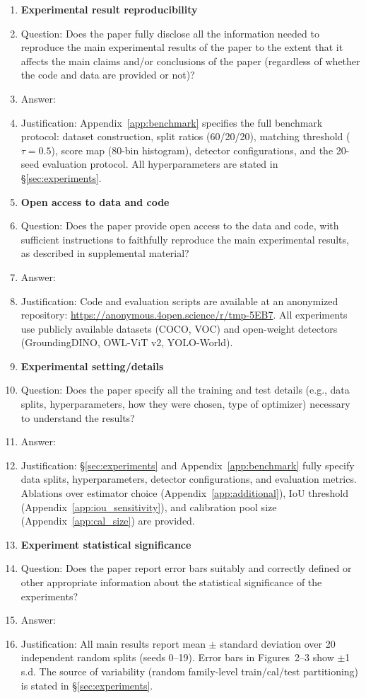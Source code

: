 \begin{enumerate}
    \item {\bf Experimental result reproducibility}
    \item[] Question: Does the paper fully disclose all the information needed to reproduce the main experimental results of the paper to the extent that it affects the main claims and/or conclusions of the paper (regardless of whether the code and data are provided or not)?
    \item[] Answer: \answerYes{}
    \item[] Justification: Appendix~\ref{app:benchmark} specifies the full benchmark protocol: dataset construction, split ratios (60/20/20), matching threshold ($\tau\!=\!0.5$), score map (80-bin histogram), detector configurations, and the 20-seed evaluation protocol. All hyperparameters are stated in \S\ref{sec:experiments}.

\item {\bf Open access to data and code}
    \item[] Question: Does the paper provide open access to the data and code, with sufficient instructions to faithfully reproduce the main experimental results, as described in supplemental material?
    \item[] Answer: \answerYes{}
    \item[] Justification: Code and evaluation scripts are available at an anonymized repository: \url{https://anonymous.4open.science/r/tmp-5EB7}. All experiments use publicly available datasets (COCO, VOC) and open-weight detectors (GroundingDINO, OWL-ViT v2, YOLO-World).

\item {\bf Experimental setting/details}
    \item[] Question: Does the paper specify all the training and test details (e.g., data splits, hyperparameters, how they were chosen, type of optimizer) necessary to understand the results?
    \item[] Answer: \answerYes{}
    \item[] Justification: \S\ref{sec:experiments} and Appendix~\ref{app:benchmark} fully specify data splits, hyperparameters, detector configurations, and evaluation metrics. Ablations over estimator choice (Appendix~\ref{app:additional}), IoU threshold (Appendix~\ref{app:iou_sensitivity}), and calibration pool size (Appendix~\ref{app:cal_size}) are provided.

\item {\bf Experiment statistical significance}
    \item[] Question: Does the paper report error bars suitably and correctly defined or other appropriate information about the statistical significance of the experiments?
    \item[] Answer: \answerYes{}
    \item[] Justification: All main results report mean $\pm$ standard deviation over 20 independent random splits (seeds 0--19). Error bars in Figures~2--3 show $\pm$1 s.d. The source of variability (random family-level train/cal/test partitioning) is stated in \S\ref{sec:experiments}.


\end{enumerate}

